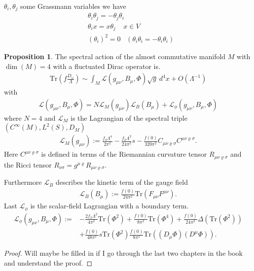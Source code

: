 \documentclass[a4paper]{article}
\theoremstyle{definition}
\theoremstyle{definition}
\theoremstyle{definition}
\theoremstyle{theorem}
\theoremstyle{theorem}
\theoremstyle{theorem}
\newtheorem{proposition}{Proposition}
\begin{document}
$\theta _i, \theta _j$ some Grassmann variables we have
\begin{align}
    &\theta _i \theta _j = -\theta _j \theta _i \\
    &\theta _i x = x\theta _j \;\;\;\; x\in V \\
    &(\theta_i)^2 = 0 \;\;\; (\theta _i \theta _i = -\theta _i \theta _i)
\end{align}
\begin{proposition}
    The spectral action of the almost commutative manifold $M$ with $\dim(M)
    =4$ with a fluctuated Dirac operator is.
    \begin{align}
        \text{Tr}(f\frac{D_\omega}{\Lambda}) \sim \int_M \mathcal{L}(g_{\mu\nu},
         B_\mu, \Phi) \sqrt{g}\ d^4x + O(\Lambda^{-1})
    \end{align}
    with
    \begin{align}
        \mathcal{L}(g_{\mu\nu}, B_\mu, \Phi) =
        N\mathcal{L}_M(g_{\mu\nu})
        \mathcal{L}_B(B_\mu)+
        \mathcal{L}_\phi(g_{\mu\nu}, B_\mu, \Phi)
    \end{align}
    where $N=4$ and $\mathcal{L}_M$ is the Lagrangian of the spectral triple
    $(C^\infty(M) , L^2(S), D_M)$
    \begin{align}\label{lagr}
        \mathcal{L}_M(g_{\mu\nu}) := \frac{f_4 \Lambda ^4}{2\pi^2} -
        \frac{f_2 \Lambda^2}{24\pi ^2}s - \frac{f(0)}{320\pi^2} C_{\mu\nu
        \varrho \sigma}C^{\mu\nu \varrho \sigma}.
    \end{align}
    Here $C^{\mu\nu \varrho \sigma}$ is defined in terms of the Riemannian
    curvature tensor $R_{\mu\nu \varrho \sigma}$ and the Ricci tensor
    $R_{\nu\sigma} = g^{\mu\varrho} R_{\mu\nu \varrho\sigma}$.


    Furthermore $\mathcal{L}_B$ describes the kinetic term of the gauge field
    \begin{align}
        \mathcal{L}_B(B_\mu) := \frac{f(0)}{24\pi^2}
        \text{Tr}(F_{\mu\nu}F^{\mu\nu}).
    \end{align}
    Last $\mathcal{L}_\phi$ is the scalar-field Lagrangian with a boundary
    term.
    \begin{align}
        \mathcal{L}_\phi(g_{\mu\nu}, B_\mu, \Phi) :=
        &-\frac{2f_2\Lambda^2}{4\pi^2}\text{Tr}(\Phi^2) + \frac{f(0)}{8\pi^2}
        \text{Tr}(\Phi^4) + \frac{f(0)}{24\pi^2} \Delta(\text{Tr}(\Phi^2))\\
        &+ \frac{f(0)}{48\pi^2}s\text{Tr}(\Phi^2)
        \frac{f(0)}{8\pi^2}\text{Tr}((D_\mu \Phi)(D^\mu \Phi)).
    \end{align}
\end{proposition}
\begin{proof}
    Will maybe be filled in if I go through the last two chapters in the
    book and understand the proof.
\end{proof}
\end{document}
